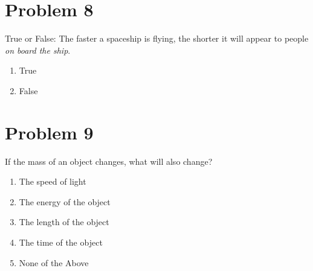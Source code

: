 \documentclass{article}
\begin{document}
\section*{Problem 8}
True or False: The faster a spaceship is flying, the shorter it will appear to people \textit{on board the ship}.
\begin{enumerate}
    \item True
    \item False
\end{enumerate}
\section*{Problem 9}
If the mass of an object changes, what will also change?
\begin{enumerate}
    \item The speed of light
    \item The energy of the object
    \item The length of the object
    \item The time of the object
    \item None of the Above
\end{enumerate}
\end{document}
